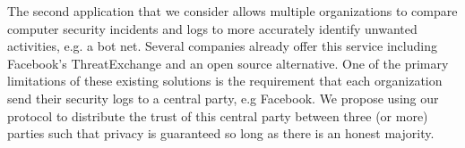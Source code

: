The second application that we consider allows multiple organizations to compare computer security incidents and logs to more accurately identify unwanted activities, e.g. a bot net. Several companies already offer this service including Facebook's ThreatExchange\cite{threat} and an open source alternative\cite{alt_threat}. One of the primary limitations of these existing solutions is the requirement that each organization send their security logs to a central party, e.g Facebook. We propose using our protocol to distribute the trust of this central party between three (or more) parties such that privacy is guaranteed so long as there is an honest majority.



